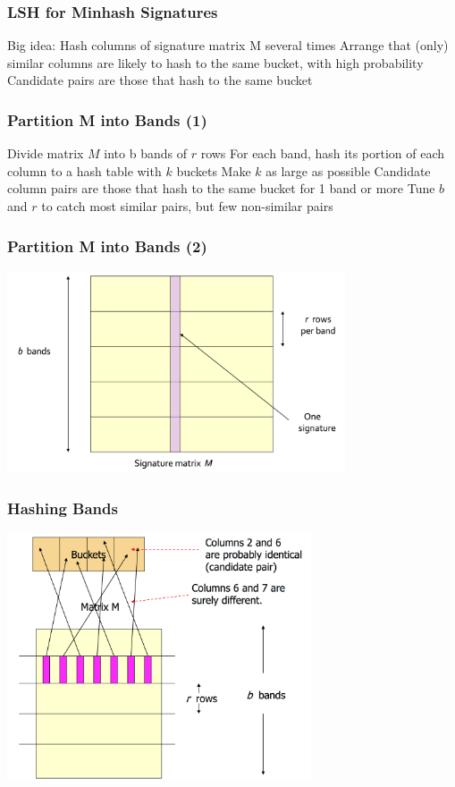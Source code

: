 \documentclass[svgnames]{beamer}
\begin{document}
\begin{frame} \frametitle{LSH for Minhash Signatures}

Big idea: Hash columns of signature matrix M several times
Arrange that (only) similar columns are likely to hash to the same bucket, with high probability
Candidate pairs are those that hash to the same bucket

\end{frame}

  
\begin{frame} \frametitle{Partition M into Bands (1)}

Divide matrix $M$ into b bands of $r$ rows
For each band, hash its portion of each column to a hash table with $k$ buckets
Make $k$ as large as possible
Candidate column pairs are those that hash to the same bucket for 1 band or more
Tune $b$ and $r$ to catch most similar pairs, but few non-similar pairs

\end{frame}

  
\begin{frame} \frametitle{Partition M into Bands (2)}

\includegraphics[width=10cm]{bands}

\end{frame}

  
\begin{frame} \frametitle{Hashing Bands}

\includegraphics[width=9cm]{hashing-bands}

\end{frame}
\end{document}
